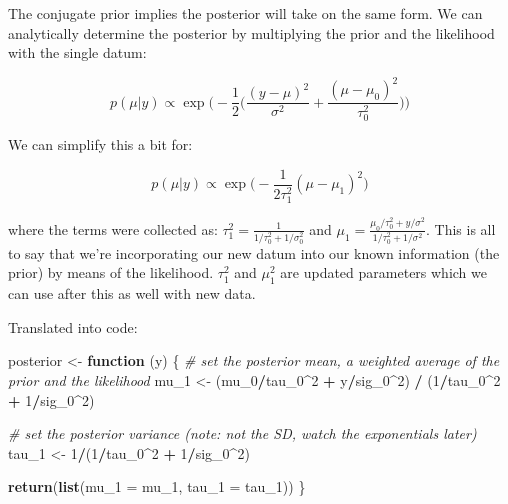\documentclass[]{book}
\newenvironment{Shaded}{\begin{snugshade}}{\end{snugshade}}
\newcommand{\KeywordTok}[1]{\textcolor[rgb]{0.13,0.29,0.53}{\textbf{#1}}}
\newcommand{\DataTypeTok}[1]{\textcolor[rgb]{0.13,0.29,0.53}{#1}}
\newcommand{\DecValTok}[1]{\textcolor[rgb]{0.00,0.00,0.81}{#1}}
\newcommand{\StringTok}[1]{\textcolor[rgb]{0.31,0.60,0.02}{#1}}
\newcommand{\CommentTok}[1]{\textcolor[rgb]{0.56,0.35,0.01}{\textit{#1}}}
\newcommand{\ControlFlowTok}[1]{\textcolor[rgb]{0.13,0.29,0.53}{\textbf{#1}}}
\newcommand{\OperatorTok}[1]{\textcolor[rgb]{0.81,0.36,0.00}{\textbf{#1}}}
\newcommand{\NormalTok}[1]{#1}
\begin{document}
The conjugate prior implies the posterior will take on the same form. We
can analytically determine the posterior by multiplying the prior and
the likelihood with the single datum:

\[
p(\mu|y) \propto \exp\big(-\frac{1}{2}\big(\frac{(y-\mu)^2}{\sigma^2} + \frac{(\mu - \mu_0)^2}{\tau_0^2}\big)\big)
\]

We can simplify this a bit for:

\[
p(\mu|y) \propto \exp\big(-\frac{1}{2\tau_1^2}(\mu - \mu_1)^2\big)
\]

where the terms were collected as:
\(\tau_1^2 = \frac{1}{1/\tau_0^2 + 1/\sigma_0^2}\) and
\(\mu_1 = \frac{\mu_0 / \tau_0^2 + y/\sigma^2}{1/\tau_0^2 + 1/\sigma^2}\).
This is all to say that we're incorporating our new datum into our known
information (the prior) by means of the likelihood. \(\tau_1^2\) and
\(\mu_1^2\) are updated parameters which we can use after this as well
with new data.

Translated into code:

\begin{Shaded}
\begin{Highlighting}[]
\NormalTok{posterior <-}\StringTok{ }\ControlFlowTok{function}\NormalTok{ (y) \{}
  \CommentTok{# set the posterior mean, a weighted average of the prior and the likelihood}
\NormalTok{  mu_}\DecValTok{1}\NormalTok{ <-}\StringTok{ }\NormalTok{(mu_}\DecValTok{0}\OperatorTok{/}\NormalTok{tau_}\DecValTok{0}\OperatorTok{^}\DecValTok{2} \OperatorTok{+}\StringTok{ }\NormalTok{y}\OperatorTok{/}\NormalTok{sig_}\DecValTok{0}\OperatorTok{^}\DecValTok{2}\NormalTok{) }\OperatorTok{/}\StringTok{ }\NormalTok{(}\DecValTok{1}\OperatorTok{/}\NormalTok{tau_}\DecValTok{0}\OperatorTok{^}\DecValTok{2} \OperatorTok{+}\StringTok{ }\DecValTok{1}\OperatorTok{/}\NormalTok{sig_}\DecValTok{0}\OperatorTok{^}\DecValTok{2}\NormalTok{)}
  
  \CommentTok{# set the posterior variance (note: not the SD, watch the exponentials later)}
\NormalTok{  tau_}\DecValTok{1}\NormalTok{ <-}\StringTok{ }\DecValTok{1}\OperatorTok{/}\NormalTok{(}\DecValTok{1}\OperatorTok{/}\NormalTok{tau_}\DecValTok{0}\OperatorTok{^}\DecValTok{2} \OperatorTok{+}\StringTok{ }\DecValTok{1}\OperatorTok{/}\NormalTok{sig_}\DecValTok{0}\OperatorTok{^}\DecValTok{2}\NormalTok{)}
  
  \KeywordTok{return}\NormalTok{(}\KeywordTok{list}\NormalTok{(}\DataTypeTok{mu_1 =}\NormalTok{ mu_}\DecValTok{1}\NormalTok{, }\DataTypeTok{tau_1 =}\NormalTok{ tau_}\DecValTok{1}\NormalTok{))}
\NormalTok{\}}
\end{Highlighting}
\end{Shaded}
\end{document}
